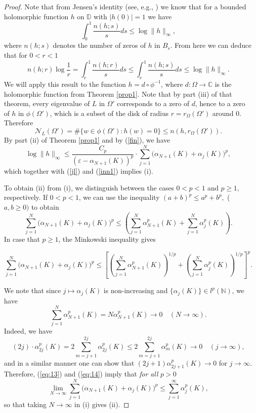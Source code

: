 \documentclass[12pt,a4paper]{article}
\theoremstyle{definition}
\theoremstyle{remark}
\numberwithin{equation}{section}
\newcommand{\mn}{{\mathbb N}}
\newcommand{\mc}{{\mathbb C}}
\newcommand{\md}{{\mathbb D}}
\renewcommand{\epsilon}{\varepsilon}
\begin{document}
\begin{proof}
Note that from Jensen's identity (see, e.g., \cite{rudin}) we know that for a bounded holomorphic function $h$ on $\md$ with $|h(0)|=1$ we have 
  \begin{equation*}
\int_0^1 \frac{n(h;s)}{s} ds \leq \log \|h\|_\infty,
  \end{equation*}
where $n(h;s)$ denotes the number of zeros of $h$ in $B_s$.
 From here we can deduce that for $0<r<1$
\begin{equation}\label{jl}n(h;r) \log \frac 1 r = \int_r^1 \frac{n(h;r)}{s} ds \leq \int_r^1 \frac{n(h;s)}{s} ds \leq \log \|h\|_\infty.\end{equation}
We will apply this result to the function $h=d \circ \phi^{-1}$, where $d : \Omega \to \mc$ is the holomorphic function from Theorem \ref{prop1}. Note
that by part (iii) of that theorem, every eigenvalue of $L$ in $\Omega'$ corresponds to a zero of $d$, hence to a zero of $h$ in $\phi(\Omega')$, which is a subset of the disk of radius 
$r=r_{\Omega}(\Omega')$ around $0$. Therefore 
\begin{equation}\label{inn1}
\mathcal{N}_L(\Omega') = \# \{ w \in \phi(\Omega') : h(w)=0\} \leq n(h,r_{\Omega}(\Omega')).
\end{equation}
By part (ii)  of Theorem \ref{prop1} and by (\ref{fin}), we have
$$\log \|h\|_\infty \leq  \frac{C_p}{(\epsilon-\alpha_{N+1}(K))^p}\cdot \sum_{j=1}^N\Big( \alpha_{N+1}(K) + \alpha_j(K) \Big)^p,$$
which together with (\ref{jl}) and (\ref{inn1}) implies (i). 

To obtain (ii)  from (i), we distinguish between the cases $0<p<1$ and $p \geq 1$, respectively. If $0<p<1$, we can use the inequality $(a+b)^p\leq a^p+b^p,$ ($a,b\geq 0)$ to obtain
\begin{equation}
  \label{eq:13}
 \sum_{j=1}^N\Big( \alpha_{N+1}(K) + \alpha_j(K) \Big)^p\leq \left( \sum_{j=1}^N \alpha_{N+1}^p(K) + \sum_{j=1}^N\alpha_j^p(K)\right). 
\end{equation}
In case that $p \geq 1$, the Minkowski inequality gives
\begin{small}
\begin{equation}
  \label{eq:14}
  \sum_{j=1}^N\Big( \alpha_{N+1}(K) + \alpha_j(K) \Big)^p  \leq \left[ \left( \sum_{j=1}^N \alpha_{N+1}^p(K) \right)^{1/p}+ \left( \sum_{j=1}^N\alpha_j^p(K)\right)^{1/p} \right]^p. 
\end{equation}
\end{small}
We note that since $j \mapsto \alpha_j(K)$ is non-increasing and $\{\alpha_j(K)\} \in l^p(\mn)$, we have 
$$\sum_{j=1}^N \alpha_{N+1}^p(K)= N\alpha_{N+1}^p(K) \to 0 \quad (N \to \infty) .$$ 
Indeed, we have
$$ (2j) \cdot \alpha_{2j}^p(K) =2 \sum_{m=j+1}^{2j} \alpha_{2j}^p(K) \leq 2\sum_{m=j+1}^{2j} \alpha_m^p(K) \to 0 \quad (j \to \infty),$$
and in a similar manner one can show that $(2j+1)\alpha_{2j+1}^p(K) \to 0$ for $j \to \infty$. Therefore, (\ref{eq:13}) and (\ref{eq:14}) imply that \emph{for all} $p>0$ 
$$\lim_{N\rightarrow \infty}\sum_{j=1}^N\Big( \alpha_{N+1}(K) + \alpha_j(K) \Big)^p\leq \sum_{j=1}^\infty\alpha_j^p(K),$$ 
so that taking $N\rightarrow \infty$ in (i) gives (ii).
\end{proof}
\end{document}
